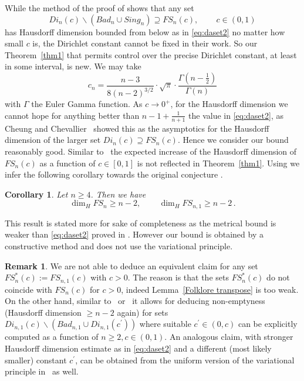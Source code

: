 \documentclass[10pt]{amsart}
\newtheorem{corollary}[theorem]{Corollary}
\theoremstyle{definition}
\newtheorem{remark}{Remark}
\begin{document}
While the method of the 
proof of \cite[Theorem~3.15]{Dasetal} 
shows that any set
\[
Di_{n}(c)\backslash \left( Bad_{n} \cup Sing_{n} \right)\supseteq FS_n(c),\,\qquad c\in (0,1) 
\]
has Hausdorff dimension bounded from below as in \eqref{eq:daset2} no matter how small $c$ is, the Dirichlet constant cannot be fixed in their work. So our Theorem~\ref{thm1} that 
permits control over the precise Dirichlet constant, at least in some interval,
is new. We may take
\[
c_n =
\frac{n-3}{8(n-2)^{3/2}}\cdot \sqrt{\pi}\cdot \frac{ \Gamma(n-\frac{1}{2})}{\Gamma(n)}
\]
with $\Gamma$ the Euler Gamma function. 
As $c\to 0^{+}$, for the Hausdorff dimension we cannot hope for anything better than $n-1+\frac{1}{n+1}$ the value in \eqref{eq:daset2},
as Cheung and Chevallier~\cite{CheungChevallier} showed this as the asymptotics for
the Hausdorff dimension of the larger set $Di_n(c)\supseteq FS_n(c)$. Hence we consider our bound reasonably good. Similar to~\cite{j1, j2} the expected increase of the Hausdorff dimension of $FS_n(c)$ as a function of $c\in[0,1]$ is not reflected in Theorem~\ref{thm1}. Using \cite[Proposition 1.1 and Lemma 4.9]{BerGuaMarRamVel} we infer the following corollary towards the original conjecture \cite[Problem 3.1]{BerGuaMarRamVel}.

\begin{corollary} \label{Folklore set dimension lower bound}
Let $n\geq 4$. Then 
    we have
\begin{equation*}
    \dim_H FS_{n} \geq n-2,\,\qquad  \dim_H FS_{n,1}\geq n-2\, .
\end{equation*}
\end{corollary}

 This result is stated more for sake of completeness as the metrical bound is weaker than \eqref{eq:daset2} proved in \cite{Dasetal}. However our bound is obtained by a constructive method and does not use the variational principle.
 






 

\begin{remark}
We are not able to deduce an equivalent claim for any set $
        FS_{n}^{*} (c):=FS_{n,1}(c)$ with $c>0$.
    The reason is that the
    sets $FS_{n}^{*} (c)$ do
    not coincide with $FS_{n}(c)$ for $c>0$, indeed Lemma~\ref{Folklore transpose} is too weak.
    On the other hand, similar
    to~\cite{BerGuaMarRamVel}
    or~\cite[Section~11]{j2}
    it allows for deducing
    non-emptyness (Hausdorff  dimension $\ge n-2$ again) for sets
    $Di_{n,1}(c)\backslash (Bad_{n,1} \cup Di_{n,1}(c^{\prime}))$
    where suitable $c^{\prime}\in (0,c)$ can
    be explicitly computed as a function of $n\ge 2,c\in (0,1)$. 
    An analogous claim, with stronger Hausdorff dimension estimate as in \eqref{eq:daset2} and a different
    (most likely smaller) constant $c^{\prime}$, can be obtained
    from the uniform version of the variational principle in~\cite{Dasetal} as well.
\end{remark}
\end{document}

